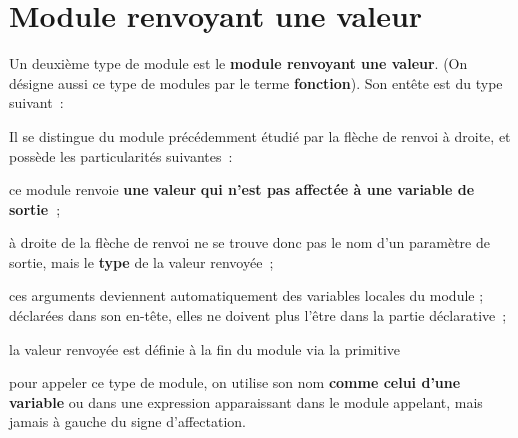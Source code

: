 \section{Module renvoyant une valeur}

	Un deuxième type de module est le 
	\textbf{module renvoyant une valeur}. 
	(On désigne aussi ce type de modules par le terme \textbf{fonction}).
	Son entête est du type suivant~:


	Il se distingue du module précédemment étudié par la flèche de renvoi à
	droite, et possède les particularités suivantes~:

	\begin{liste}
	\item {
		{ce module renvoie
		}{\textbf{une}}{
		}{\textbf{valeur}}{
		}{\textbf{qui n’est pas affectée à une variable
		de
		}}{\textbf{sortie~}}{;}}
	\item {
		{à droite de la flèche de renvoi ne se trouve
		donc pas le nom d’un paramètre de sortie, mais le
		}{\textbf{type}}{ de la
		valeur renvoyée~;}}
	\item {
		}
	\item {
		}
	\item {
		ces arguments deviennent automatiquement des variables locales du module
		; déclarées dans son en-tête, elles ne doivent plus l’être dans la
		partie déclarative~;}
	\item {
		{la valeur renvoyée est définie à la fin du
		module via la primitive
		}}
	\item {
		pour appeler ce type de module, on utilise son nom \textbf{comme celui
		d’une variable} ou dans une expression apparaissant 
		dans le module appelant, mais jamais à gauche du signe
		d’affectation.}
	\end{liste}

